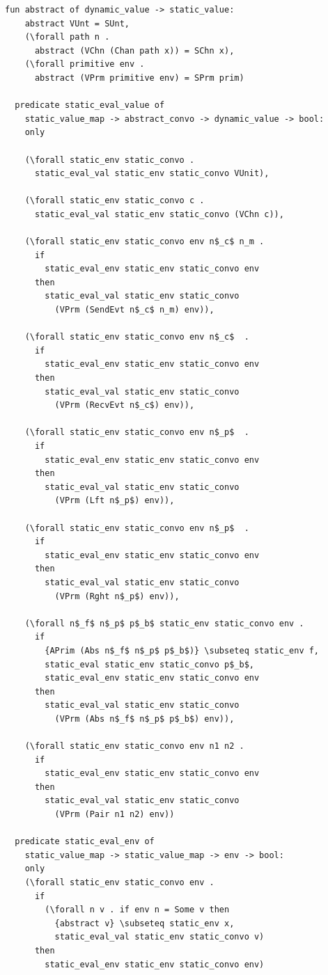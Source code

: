 \documentclass[10pt]{article}
\begin{document}
\begin{lstlisting}[language=logic, mathescape]
  fun abstract of dynamic_value -> static_value:
    abstract VUnt = SUnt, 
    (\forall path n . 
      abstract (VChn (Chan path x)) = SChn x),
    (\forall primitive env .
      abstract (VPrm primitive env) = SPrm prim)

  predicate static_eval_value of
    static_value_map -> abstract_convo -> dynamic_value -> bool: 
    only

    (\forall static_env static_convo .
      static_eval_val static_env static_convo VUnit),

    (\forall static_env static_convo c .
      static_eval_val static_env static_convo (VChn c)),

    (\forall static_env static_convo env n$_c$ n_m .
      if
        static_eval_env static_env static_convo env
      then
        static_eval_val static_env static_convo
          (VPrm (SendEvt n$_c$ n_m) env)),

    (\forall static_env static_convo env n$_c$  .
      if
        static_eval_env static_env static_convo env
      then
        static_eval_val static_env static_convo
          (VPrm (RecvEvt n$_c$) env)),

    (\forall static_env static_convo env n$_p$  .
      if
        static_eval_env static_env static_convo env
      then
        static_eval_val static_env static_convo
          (VPrm (Lft n$_p$) env)),
        
    (\forall static_env static_convo env n$_p$  .
      if
        static_eval_env static_env static_convo env
      then
        static_eval_val static_env static_convo
          (VPrm (Rght n$_p$) env)),

    (\forall n$_f$ n$_p$ p$_b$ static_env static_convo env .
      if
        {APrim (Abs n$_f$ n$_p$ p$_b$)} \subseteq static_env f, 
        static_eval static_env static_convo p$_b$, 
        static_eval_env static_env static_convo env
      then
        static_eval_val static_env static_convo
          (VPrm (Abs n$_f$ n$_p$ p$_b$) env)),

    (\forall static_env static_convo env n1 n2 .
      if
        static_eval_env static_env static_convo env
      then
        static_eval_val static_env static_convo
          (VPrm (Pair n1 n2) env))

  predicate static_eval_env of
    static_value_map -> static_value_map -> env -> bool:
    only 
    (\forall static_env static_convo env .
      if
        (\forall n v . if env n = Some v then
          {abstract v} \subseteq static_env x,
          static_eval_val static_env static_convo v)
      then 
        static_eval_env static_env static_convo env)


\end{lstlisting}
\end{document}
